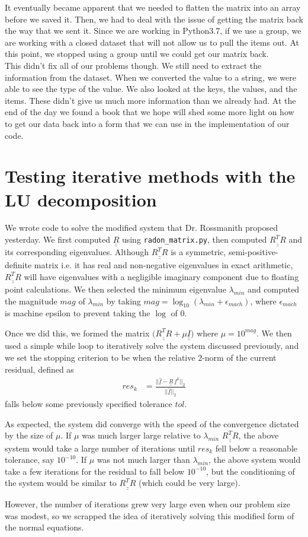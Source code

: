 \documentclass[12pt]{article}
\newcommand{\bunderline}[1]{\underline{#1}}
\renewcommand{\vec}[1]{{\bunderline{#1}}}
\newcommand{\mat}[1]{{\bunderline{\bunderline{#1}}}}
\begin{document}
It eventually became apparent that we needed to flatten the matrix into an array before we saved it. Then, we had to deal with the issue of getting the matrix back the way that we sent it. Since we are working in Python3.7, if we use a group, we are working with a closed dataset that will not allow us to pull the items out. At this point, we stopped using a group until we could get our matrix back. \\

This didn't fix all of our problems though. We still need to extract the information from the dataset. When we converted the value to a string, we were able to see the type of the value. We also looked at the keys, the values, and the items. These didn't give us much more information than we already had. At the end of the day we found a book that we hope will shed some more light on how to get our data back into a form that we can use in the implementation of our code.

\section*{Testing iterative methods with the LU decomposition}
We wrote code to solve the modified system that Dr. Rossmanith proposed yesterday.
We first computed $\mat{R}$ using \verb|radon_matrix.py|, then computed $\mat{R^{T} R}$ and its corresponding eigenvalues.
Although $\mat{R^{T} R}$ is a symmetric, semi-positive-definite matrix i.e. it has real and non-negative eigenvalues in exact arithmetic, $\mat{R^{T} R}$ will have eigenvalues with a negligible imaginary component due to floating point calculations.
We then selected the minimum eigenvalue $\lambda_{min}$ and computed the magnitude $mag$ of $\lambda_{min}$ by taking $mag = \log_{10} (\lambda_{min} + \epsilon_{mach})$, where $\epsilon_{mach}$ is machine epsilon to prevent taking the $\log$ of $0$.
\par 
Once we did this, we formed the matrix $\Big( \mat{R^{T} R} + \mu \mat{I} \Big)$ where $\mu = 10^{mag}$.
We then used a simple while loop to iteratively solve the system discussed previously, and we set the stopping criterion to be when the relative $2$-norm of the current residual, defined as
\begin{align*}
	res_{k} & = \frac{||\vec{\hat{f}} - \mat{R} \, \vec{f}^{k}||_{2}}{||\vec{\hat{f}}||_{2}}
\end{align*}
falls below some previously specified tolerance $tol$.
\par 
As expected, the system did converge with the speed of the convergence dictated by the size of $\mu$.
If $\mu$ was much larger large relative to $\lambda_{min}$ $\mat{R^{T} R}$, the above system would take a large number of iterations until $res_{k}$ fell below a reasonable tolerance, say $10^{-10}$.
If $\mu$ was not much larger than $\lambda_{min}$, the above system would take a few iterations for the residual to fall below $10^{-10}$, but the conditioning of the system would be similar to $\mat{R^{T} R}$ (which could be very large).
\par 
However, the number of iterations grew very large even when our problem size was modest, so we scrapped the idea of iteratively solving this modified form of the normal equations.
\end{document}
